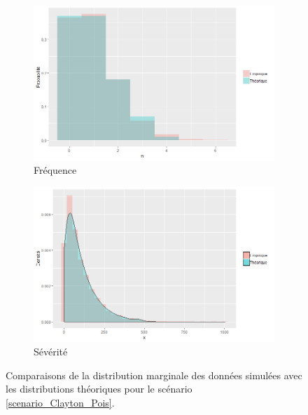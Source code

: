 \documentclass{article}
\begin{document}
		\begin{figure}[H]
			\begin{subfigure}[l]{0.5\textwidth}
				\includegraphics[width=\textwidth]{Graph/Clayton_Poiss_1_N.png}
				\caption{Fréquence}
			\end{subfigure}
			\begin{subfigure}[r]{0.5\textwidth}
				\includegraphics[width=\textwidth]{Graph/Clayton_Poiss_1_X.png}
				\caption{Sévérité}
			\end{subfigure}
			\caption{Comparaisons de la distribution marginale des données simulées avec les distributions théoriques pour le scénario \ref{scenario_Clayton_Pois}.}\label{graph_densite_Poisson_1}
		\end{figure}
	
\end{document}
